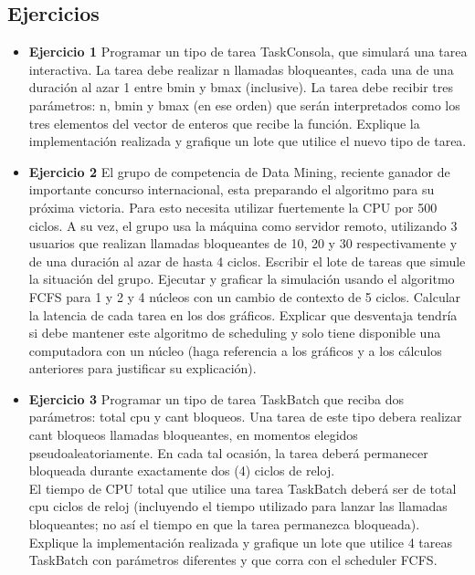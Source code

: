 
\subsection{Ejercicios}
\begin{itemize}
 \item \textbf{Ejercicio 1 } Programar un tipo de tarea TaskConsola, que simular\'{a} una tarea interactiva.
La tarea debe realizar n llamadas bloqueantes, cada una de una duraci\'{o}n al azar 1 entre bmin
y bmax (inclusive). La tarea debe recibir tres par\'{a}metros: n, bmin y bmax (en ese orden)
que ser\'{a}n interpretados como los tres elementos del vector de enteros que recibe la funci\'{o}n.
Explique la implementaci\'{o}n realizada y grafique un lote que utilice el nuevo tipo de tarea.
\item \textbf{Ejercicio 2} El grupo de competencia de Data Mining, reciente ganador de importante concurso internacional, esta
preparando el algoritmo para su próxima victoria. Para esto necesita utilizar fuertemente la CPU por 500 ciclos.
A su vez, el grupo usa la máquina como servidor remoto, utilizando 3 usuarios que realizan llamadas bloqueantes de 10, 20 y 30 
respectivamente y de una duración al azar de hasta 4 ciclos.
Escribir el lote de tareas que simule la situación del grupo. Ejecutar y graficar la simulación usando el algoritmo FCFS para 1 y 2 y 4 
núcleos con un cambio de contexto de 5 ciclos. Calcular la latencia de cada tarea en los dos gráficos. Explicar 
que desventaja tendría si debe mantener este algoritmo de scheduling y solo tiene disponible una computadora con un núcleo (haga
referencia a los gráficos y a los cálculos anteriores para justificar su explicación).

\item \textbf{Ejercicio 3} Programar un tipo de tarea TaskBatch que reciba dos par\'{a}metros: total cpu y
cant bloqueos. Una tarea de este tipo debera realizar cant bloqueos llamadas bloqueantes, en
momentos elegidos pseudoaleatoriamente. En cada tal ocasi\'{o}n, la tarea deber\'{a} permanecer
bloqueada durante exactamente dos (4) ciclos de reloj. \\
El tiempo de CPU total que utilice una
tarea TaskBatch deber\'{a} ser de total cpu ciclos de reloj (incluyendo el tiempo utilizado para
lanzar las llamadas bloqueantes; no as\'{i} el tiempo en que la tarea permanezca bloqueada).
Explique la implementaci\'{o}n realizada y grafique un lote que utilice 4 tareas TaskBatch con
par\'{a}metros diferentes y que corra con el scheduler FCFS.
\end{itemize}

